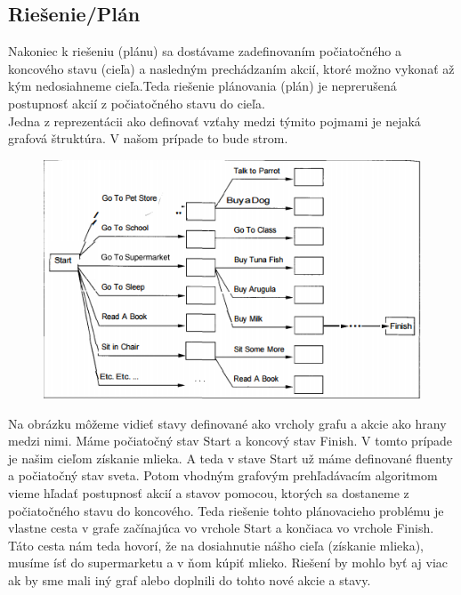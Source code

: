 \subsection{Riešenie/Plán}
Nakoniec k riešeniu (plánu) sa dostávame zadefinovaním počiatočného a koncového stavu (cieľa) a nasledným prechádzaním akcií, ktoré možno vykonať až kým nedosiahneme cieľa.Teda riešenie plánovania (plán) je neprerušená postupnosť akcií z počiatočného stavu do cieľa.\\
Jedna z reprezentácii ako definovať vzťahy medzi týmito pojmami je nejaká grafová štruktúra. V našom prípade to bude strom.
\begin{figure}[ht] 
\begin{center}
\includegraphics[scale=1.0]{img/plan.png}
\label{fig:ch2}
\end{center}
\end{figure}
Na obrázku môžeme vidieť stavy definované ako vrcholy grafu a akcie ako hrany medzi nimi. Máme počiatočný stav Start a koncový stav Finish. V tomto prípade je našim cieľom získanie mlieka. A teda v stave Start už máme definované fluenty a počiatočný stav sveta. Potom vhodným grafovým prehľadávacím algoritmom vieme hľadať postupnosť akcií a stavov pomocou, ktorých sa dostaneme z počiatočného stavu do koncového. Teda riešenie tohto plánovacieho problému je vlastne cesta v grafe začínajúca vo vrchole Start a končiaca vo vrchole Finish. Táto cesta nám teda hovorí, že na dosiahnutie nášho cieľa (získanie mlieka), musíme ísť do supermarketu a v ňom kúpiť mlieko. Riešení by mohlo byť aj viac ak by sme mali iný graf alebo doplnili do tohto nové akcie a stavy.

